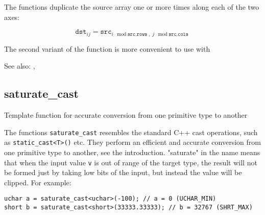 The functions  duplicate the source array one or more times along each of the two axes:

\[\texttt{dst}_{ij}=\texttt{src}_{i\mod\texttt{src.rows},\;j\mod\texttt{src.cols}}\]

The second variant of the function is more convenient to use with 

See also: , 

\ifplastex
{}\label{cppfunc.saturatecast}
\else
\subsection{saturate\_cast}\label{cppfunc.saturatecast}
\fi
Template function for accurate conversion from one primitive type to another


\begin{description}
\end{description}

The functions \texttt{saturate\_cast} resembles the standard C++ cast operations, such as \texttt{static\_cast<T>()} etc. They perform an efficient and accurate conversion from one primitive type to another, see the introduction. "saturate" in the name means that when the input value \texttt{v} is out of range of the target type, the result will not be formed just by taking low bits of the input, but instead the value will be clipped. For example:

\begin{lstlisting}
uchar a = saturate_cast<uchar>(-100); // a = 0 (UCHAR_MIN)
short b = saturate_cast<short>(33333.33333); // b = 32767 (SHRT_MAX)
\end{lstlisting}


